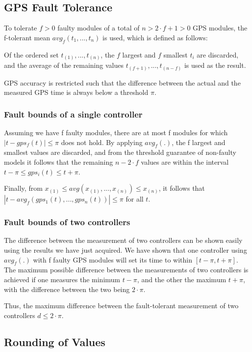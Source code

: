 \documentclass[12pt,a4paper,titlepage,oneside]{article}
\begin{document}
\subsection{GPS Fault Tolerance}

To tolerate $f > 0$ faulty modules of a total of $n > 2 \cdot f + 1 >
0$ GPS modules, the f-tolerant mean $avg_f(t_1, ... , t_n)$ is used, which is
defined as follows:

Of the ordered set $t_{(1)}, ... , t_{(n)}$, the $f$ largest and $f$ smallest
$t_i$ are discarded, and the average of the remaining values $t_{(f + 1)}, ...,
t_{(n - f)}$ is used as the result.

GPS accuracy is restricted such that the difference between the actual and the
measured GPS time is always below a threshold $\pi$.

\subsubsection{Fault bounds of a single controller}

Assuming we have f faulty modules, there are at most f modules for which
$|t-gps_f(t)| \leq \pi$ does not hold. By applying $avg_f(.)$, the f largest and
smallest values are discarded, and from the threshold guarantee of non-faulty
models it follows that the remaining $n - 2 \cdot f$ values are within the
interval $t - \pi \leq gps_i(t) \leq t + \pi$.

Finally, from $x_{(1)} \leq avg(x_{(1)}, ..., x_{(n)}) \leq x_{(n)}$, it follows
that $|t - avg_f(gps_1(t), ..., gps_n(t))| \leq \pi$ for all $t$.

\subsubsection{Fault bounds of two controllers}

The difference between the measurement of two controllers can be shown easily
using the results we have just acquired. We have shown that one controller using
$avg_f(.)$ with f faulty GPS modules will set its time to within $[t - \pi, t +
\pi]$. The maximum possible difference between the measurements of two
controllers is achieved if one measures the minimum $t - \pi$, and the other the
maximum $t + \pi$, with the difference between the two being $2 \cdot \pi$.

Thus, the maximum difference between the fault-tolerant measurement of two
controllers $d \leq 2 \cdot \pi$.

\subsection{Rounding of Values}
\end{document}
